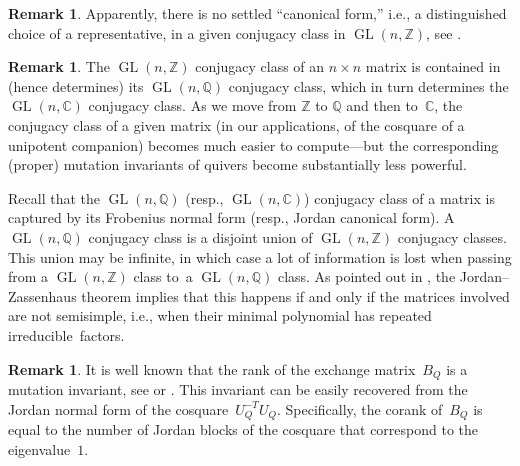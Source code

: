 \documentclass[11pt, letterpaper]{amsart}
\theoremstyle{definition}
\newtheorem{remark}[theorem]{Remark}
\numberwithin{equation}{section}
\def\ZZ{{\mathbb Z}}
\def\QQ{{\mathbb Q}}
\def\CC{{\mathbb C}}
\def\GL{{\operatorname{GL}}}
\begin{document}

\begin{remark}
Apparently, there is no settled ``canonical form,'' i.e., a distinguished choice of a representative, 
in a given conjugacy class in $\GL(n, \ZZ)$, see \cite[Problem~7.3]{EHO}. 
\end{remark}

\begin{remark}
\label{rem:conjugacy-over-Q-or-C}
The $\GL(n,\mathbb{Z})$ conjugacy class of an $n\times n$ matrix 
is contained in (hence determines) its $\GL(n,\mathbb{Q})$ conjugacy class,
which in turn determines the $\GL(n,\mathbb{C})$ conjugacy class. 
As we move from $\ZZ$ to $\QQ$ and then to~$\CC$, 
the conjugacy class of a given matrix
(in our applications, of the cosquare of a unipotent companion)
becomes much easier to compute---but the corresponding (proper) mutation invariants of quivers 
become substantially less powerful. 

Recall that the $\GL(n,\mathbb{Q})$ (resp., $\GL(n,\mathbb{C})$) conjugacy class
of a matrix is captured by its Frobenius normal form (resp., Jordan canonical form). 
A~$\GL(n,\mathbb{Q})$ conjugacy class is a disjoint union of $\GL(n,\mathbb{Z})$ conjugacy classes. 
This union may be infinite, in which case a lot of information is lost when passing from a $\GL(n,\mathbb{Z})$ class
to~a $\GL(n,\mathbb{Q})$ class. 
As pointed out in \cite[p.~755]{EHO}, the Jordan--Zassen\-haus theorem \cite{Zassenhaus} implies that 
this happens if and only if the matrices involved are not semisimple, 
i.e., when their minimal polynomial has repeated irreducible~factors. 
\end{remark}

\begin{remark}
\label{rem:rank(B)}
It is well known that the rank of the exchange matrix~$B_Q$ is a mutation invariant, see 
\cite[Theorem 2.8.3]{fwz1-3} or \cite[Lemma~3.2]{ca3}. 
%
This invariant %
can be easily recovered
from the Jordan normal form of the cosquare~$U_Q^{-T}U_Q$.
Specifically, the corank of~$B_Q$ is equal to the number of Jordan blocks of the cosquare
that correspond to the eigenvalue~$1$. 
\end{remark}
\end{document}
